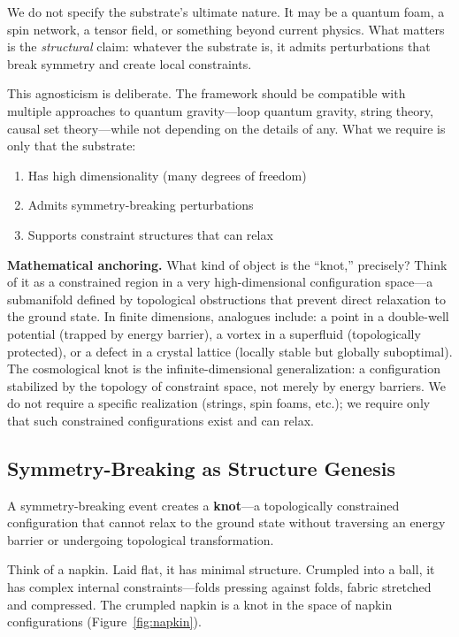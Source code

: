 \documentclass[11pt,a4paper]{article}
\begin{document}
We do not specify the substrate's ultimate nature. It may be a quantum foam, a spin network, a tensor field, or something beyond current physics. What matters is the \emph{structural} claim: whatever the substrate is, it admits perturbations that break symmetry and create local constraints.

This agnosticism is deliberate. The framework should be compatible with multiple approaches to quantum gravity---loop quantum gravity, string theory, causal set theory---while not depending on the details of any. What we require is only that the substrate:
\begin{enumerate}
    \item Has high dimensionality (many degrees of freedom)
    \item Admits symmetry-breaking perturbations
    \item Supports constraint structures that can relax
\end{enumerate}

\textbf{Mathematical anchoring.} What kind of object is the ``knot,'' precisely? Think of it as a constrained region in a very high-dimensional configuration space---a submanifold defined by topological obstructions that prevent direct relaxation to the ground state. In finite dimensions, analogues include: a point in a double-well potential (trapped by energy barrier), a vortex in a superfluid (topologically protected), or a defect in a crystal lattice (locally stable but globally suboptimal). The cosmological knot is the infinite-dimensional generalization: a configuration stabilized by the topology of constraint space, not merely by energy barriers. We do not require a specific realization (strings, spin foams, etc.); we require only that such constrained configurations exist and can relax.

\subsection{Symmetry-Breaking as Structure Genesis}

A symmetry-breaking event creates a \textbf{knot}---a topologically constrained configuration that cannot relax to the ground state without traversing an energy barrier or undergoing topological transformation.

Think of a napkin. Laid flat, it has minimal structure. Crumpled into a ball, it has complex internal constraints---folds pressing against folds, fabric stretched and compressed. The crumpled napkin is a knot in the space of napkin configurations (Figure~\ref{fig:napkin}).
\end{document}
